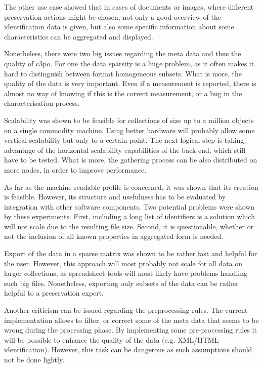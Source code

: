 The other use case showed that in cases of documents or images, where different preservation actions might be chosen, not only a good overview of the identification data is given, but also some specific information about some characteristics can be aggregated and displayed.

Nonetheless, there were two big issues regarding the meta data and thus the quality of c3po. For one the data sparsity is a huge problem, as it often makes it hard to distinguish between format homogeneous subsets. What is more, the quality of the data is very important. Even if a measurement is reported, there is almost no way of knowing if this is the correct measurement, or a bug in the characterisation process.

Scalability was shown to be feasible for collections of size up to a million objects on a single commodity machine. Using  better hardware will probably allow some vertical scalability but only to a certain point. The next logical step is taking advantage of the horizontal scalability capabilities of the back end, which still have to be tested. What is more, the gathering process can be also distributed on more nodes, in order to improve performance.

As far as the machine readable profile is concerned, it was shown that its creation is feasible. However, its structure and usefulness has to be evaluated by integration with other software components. Two potential problems were shown by these experiments. First, including a long list of identifiers is a solution which will not scale due to the resulting file size.
Second, it is questionable, whether or not the inclusion of all known properties in aggregated form is needed.

Export of the data in a sparse matrix was shown to be rather fast and helpful for the user. However, this approach will most probably not scale for all data on larger collections, as spreadsheet tools will most likely have problems handling such big files. Nonetheless, exporting only subsets of the data can be rather helpful to a preservation
expert.

Another criticism can be issued regarding the preprocessing rules. The current implementation allows to filter, or correct some of the meta data that seems to be wrong during the processing phase. By implementing some pre-processing rules it will be possible to enhance the quality of the data (e.g. XML/HTML identification). However, this task can be dangerous as such assumptions should not be done lightly.

